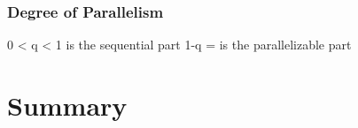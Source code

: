 \subsubsection{Degree of Parallelism}
	0 < q < 1 is the sequential part
	1-q = is the parallelizable part






%
%
%
%
%
%
%
\section{Summary}
%
